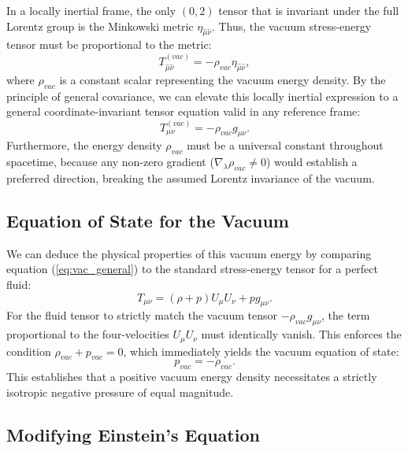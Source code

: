\documentclass[11pt, a4paper]{report}
\begin{document}
In a locally inertial frame, the only $(0,2)$ tensor that is invariant under the full Lorentz group is the Minkowski metric $\eta_{\hat{\mu}\hat{\nu}}$. Thus, the vacuum stress-energy tensor must be proportional to the metric:
\begin{equation}
\label{eq:vac_inertial}
T_{\hat{\mu}\hat{\nu}}^{(vac)} = -\rho_{vac} \eta_{\hat{\mu}\hat{\nu}},
\end{equation}
where $\rho_{vac}$ is a constant scalar representing the vacuum energy density. By the principle of general covariance, we can elevate this locally inertial expression to a general coordinate-invariant tensor equation valid in any reference frame:
\begin{equation}
\label{eq:vac_general}
T_{\mu\nu}^{(vac)} = -\rho_{vac} g_{\mu\nu}.
\end{equation}
Furthermore, the energy density $\rho_{vac}$ must be a universal constant throughout spacetime, because any non-zero gradient ($\nabla_\lambda \rho_{vac} \neq 0$) would establish a preferred direction, breaking the assumed Lorentz invariance of the vacuum.

\subsection{Equation of State for the Vacuum}

We can deduce the physical properties of this vacuum energy by comparing equation (\ref{eq:vac_general}) to the standard stress-energy tensor for a perfect fluid:
\begin{equation}
T_{\mu\nu} = (\rho + p)U_{\mu}U_{\nu} + p g_{\mu\nu}.
\end{equation}
For the fluid tensor to strictly match the vacuum tensor $-\rho_{vac} g_{\mu\nu}$, the term proportional to the four-velocities $U_\mu U_\nu$ must identically vanish. This enforces the condition $\rho_{vac} + p_{vac} = 0$, which immediately yields the vacuum equation of state:
\begin{equation}
\label{eq:vac_pressure}
p_{vac} = -\rho_{vac}.
\end{equation}
This establishes that a positive vacuum energy density necessitates a strictly isotropic negative pressure of equal magnitude.

\subsection{Modifying Einstein's Equation}
\end{document}
